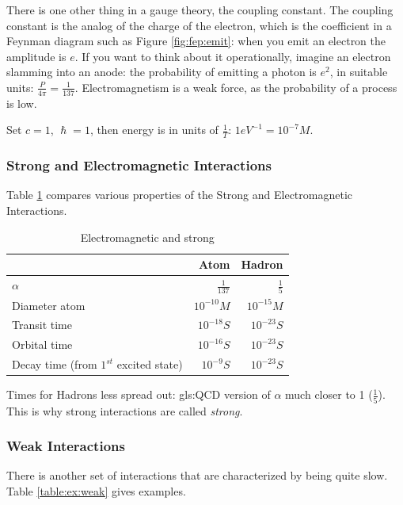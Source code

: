 \documentclass[]{article}
\begin{document}
There is one other thing in a gauge theory, the coupling constant. The coupling constant is the analog of the charge of the electron, which is the coefficient in a Feynman diagram such as Figure \ref{fig:fep:emit}: when you emit an electron the amplitude is $e$. If you want to think about it operationally, imagine an electron slamming into an anode: the probability of emitting a photon is $e^2$, in suitable units: $\frac{P}{4\pi}=\frac{1}{137}$. Electromagnetism is a weak force, as the probability of a process is low. 

Set $c=1$, $\hslash=1$, then energy is in units of $\frac{1}{T}$: $1eV^{-1}=10^{-7}M$.

\subsubsection{Strong and Electromagnetic Interactions}

Table \ref{table:ems} compares various properties of the Strong and Electromagnetic Interactions.

\begin{table}[H]
	\begin{center}
		\caption{Electromagnetic and strong}\label{table:ems}
		\begin{tabular}{|l|r|r|} \hline
			&\textbf{Atom}&\textbf{Hadron} \\ \hline
			$\alpha$&$\frac{1}{137}$&$\frac{1}{5}$\\ \hline	
			Diameter atom&$10^{-10}M$&$10^{-15}M$ \\ \hline
			Transit time &$10^{-18}S$&$10^{-23}S$\\ \hline
			Orbital time &$10^{-16}S$&$10^{-23}S$\\ \hline
			Decay time (from $1^{st}$ excited state)&$10^{-9}S$&$10^{-23}S$\\ \hline
		\end{tabular}
	\end{center}
\end{table}

Times for Hadrons less spread out: \gls{gls:QCD} version of $\alpha$ much closer to 1 ($\frac{1}{5}$). This is why strong interactions are called \emph{strong}.

\subsubsection{Weak Interactions}

There is another set of interactions that are characterized by being quite slow. Table \ref{table:ex:weak} gives examples.
\end{document}
